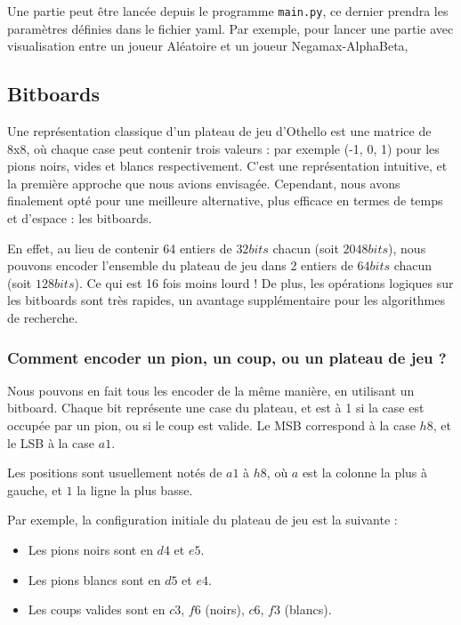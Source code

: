 Une partie peut être lancée depuis le programme \texttt{main.py}, ce dernier prendra les paramètres définies dans le fichier yaml. Par exemple, pour lancer une partie avec visualisation entre un joueur Aléatoire et un joueur Negamax-AlphaBeta, 


\subsection{Bitboards}
\label{subsec:bit}
Une représentation classique d'un plateau de jeu d'Othello est une matrice de 8x8, où chaque case peut contenir trois valeurs : par exemple (-1, 0, 1) pour les pions noirs, vides et blancs respectivement. C'est une représentation intuitive, et la première approche que nous avions envisagée. Cependant, nous avons finalement opté pour une meilleure alternative, plus efficace en termes de temps et d'espace : les bitboards.

En effet, au lieu de contenir 64 entiers de $32 bits$ chacun (soit $2048 bits$), nous pouvons encoder l'ensemble du plateau de jeu dans 2 entiers de $64 bits$ chacun (soit $128bits$). Ce qui est 16 fois moins lourd ! De plus, les opérations logiques sur les bitboards sont très rapides, un avantage supplémentaire pour les algorithmes de recherche.

\subsubsection{Comment encoder un pion, un coup, ou un plateau de jeu ?}
\label{subsubsec:enc}
Nous pouvons en fait tous les encoder de la même manière, en utilisant un bitboard. Chaque bit représente une case du plateau, et est à 1 si la case est occupée par un pion, ou si le coup est valide. Le \ac{MSB} correspond à la case $h8$, et le \ac{LSB} à la case $a1$.

Les positions sont usuellement notés de $a1$ à $h8$, où $a$ est la colonne la plus à gauche, et $1$ la ligne la plus basse. \cite{brian_rose_2005} 

Par exemple, la configuration initiale du plateau de jeu est la suivante :
\begin{itemize}
    \item Les pions noirs sont en $d4$ et $e5$.
    \item Les pions blancs sont en $d5$ et $e4$.
    \item Les coups valides sont en $c3$, $f6$ (noirs), $c6$, $f3$ (blancs).
\end{itemize}

